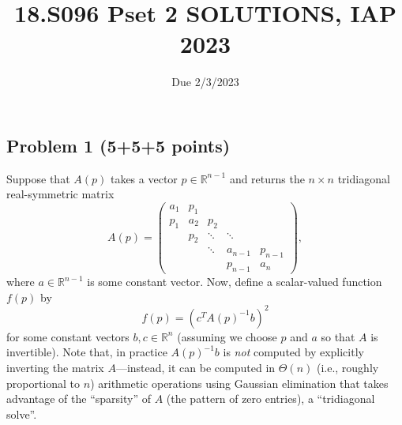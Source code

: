 \documentclass{article}
\title{18.S096 Pset 2 SOLUTIONS, IAP 2023}
\date{Due 2/3/2023}
\newcommand{\R}{\mathbb{R}}
\begin{document}
\maketitle


\subsection*{Problem 1 (5+5+5 points)}

Suppose that $A(p)$ takes a vector $p\in\R^{n-1}$ and returns
the $n\times n$ tridiagonal real-symmetric matrix
\[
A(p)=\left(\begin{array}{ccccc}
a_{1} & p_{1}\\
p_{1} & a_{2} & p_{2}\\
 & p_{2} & \ddots & \ddots\\
 &  & \ddots & a_{n-1} & p_{n-1}\\
 &  &  & p_{n-1} & a_{n}
\end{array}\right),
\]
where $a\in\R^{n-1}$ is some constant vector. Now, define
a scalar-valued function $f(p)$ by 
\[
f(p)=\left(c^{T}A(p)^{-1}b\right)^{2}
\]
for some constant vectors $b,c\in\R^{n}$ (assuming we choose
$p$ and $a$ so that $A$ is invertible). Note that, in practice
$A(p)^{-1}b$ is \emph{not }computed by explicitly inverting the matrix
$A$---instead, it can be computed in $\Theta(n)$ (i.e., roughly
proportional to $n$) arithmetic operations using Gaussian elimination
that takes advantage of the ``sparsity'' of $A$ (the pattern of
zero entries), a ``tridiagonal solve''.
\end{document}
